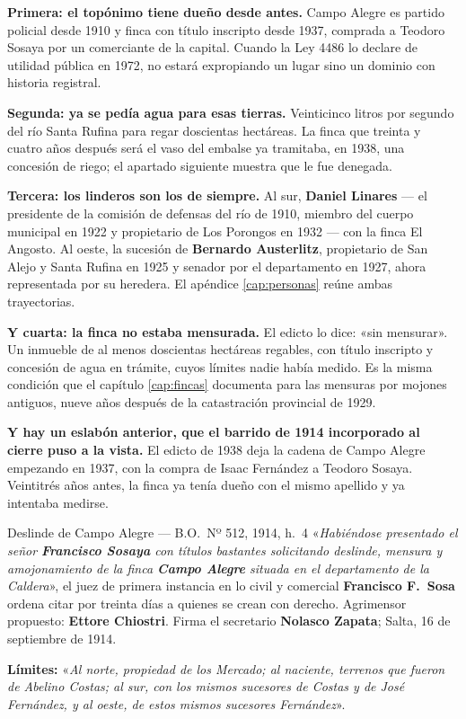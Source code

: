 \textbf{Primera: el topónimo tiene dueño desde antes.} Campo Alegre es partido policial desde
1910 y finca con título inscripto desde 1937, comprada a Teodoro Sosaya por un comerciante de
la capital. Cuando la Ley 4486 lo declare de utilidad pública en 1972, no estará expropiando
un lugar sino un dominio con historia registral.

\textbf{Segunda: ya se pedía agua para esas tierras.} Veinticinco litros por segundo
del río Santa Rufina para regar doscientas hectáreas. La finca que treinta y cuatro años
después será el vaso del embalse ya tramitaba, en 1938, una
concesión de riego; el apartado siguiente muestra que le fue denegada.

\textbf{Tercera: los linderos son los de siempre.} Al sur, \textbf{Daniel Linares} --- el
presidente de la comisión de defensas del río de 1910, miembro del cuerpo municipal en 1922 y
propietario de Los Porongos en 1932 --- con la finca El Angosto. Al oeste, la sucesión de
\textbf{Bernardo Austerlitz}, propietario de San Alejo y Santa Rufina en 1925 y senador por el
departamento en 1927, ahora representada por su heredera. El apéndice \ref{cap:personas} reúne ambas
trayectorias.

\textbf{Y cuarta: la finca no estaba mensurada.} El edicto lo dice: «sin mensurar». Un
inmueble de al menos doscientas hectáreas regables, con título inscripto y concesión de agua
en trámite, cuyos límites nadie había medido. Es la misma condición que el capítulo \ref{cap:fincas}
documenta para las mensuras por mojones antiguos, nueve años después de la catastración
provincial de 1929.

\textbf{Y hay un eslabón anterior, que el barrido de 1914 incorporado al cierre puso a la
vista.} El edicto de 1938 deja la cadena de Campo Alegre empezando en 1937, con la compra de
Isaac Fernández a Teodoro Sosaya. Veintitrés años antes, la finca ya tenía dueño con el mismo
apellido y ya intentaba medirse.

\begin{ficha}{Deslinde de Campo Alegre --- B.O.\ Nº 512, 1914, h.\ 4}
«\textit{Habiéndose presentado el señor \textbf{Francisco Sosaya} con títulos bastantes
solicitando deslinde, mensura y amojonamiento de la finca \textbf{Campo Alegre} situada en el
departamento de la Caldera}», el juez de primera instancia en lo civil y comercial
\textbf{Francisco F.\ Sosa} ordena citar por treinta días a quienes se crean con derecho.
Agrimensor propuesto: \textbf{Ettore Chiostri}. Firma el secretario \textbf{Nolasco Zapata};
Salta, 16 de septiembre de 1914.

\textbf{Límites:} «\textit{Al norte, propiedad de los Mercado; al naciente, terrenos que
fueron de Abelino Costas; al sur, con los mismos sucesores de Costas y de José Fernández, y al
oeste, de estos mismos sucesores Fernández}».
\end{ficha}

